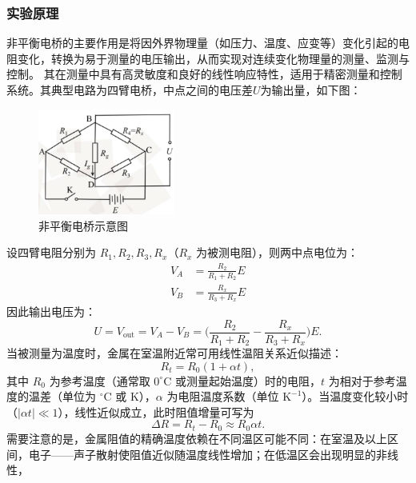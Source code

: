 \documentclass[]{../template/Report}%
\begin{document}
\subsubsection{实验原理}
非平衡电桥的主要作用是将因外界物理量（如压力、温度、应变等）变化引起的电阻变化，转换为易于测量的电压输出，从而实现对连续变化物理量的测量、监测与控制。
其在测量中具有高灵敏度和良好的线性响应特性，适用于精密测量和控制系统。其典型电路为四臂电桥，中点之间的电压差$U$为输出量，如下图：
\begin{figure}[H]
    \centering
    \includegraphics[width=0.4\textwidth]{figure/非平衡电桥示意图.png}
    \caption{非平衡电桥示意图}
    \label{fig:fig1}
\end{figure}
\noindent 设四臂电阻分别为 $R_1,R_2,R_3,R_x$（$R_x$ 为被测电阻），则两中点电位为：
\begin{equation}
\begin{aligned}
V_A&=\frac{R_2}{R_1+R_2}E\\
V_B&=\frac{R_x}{R_3+R_x}E
\end{aligned}
\end{equation}
因此输出电压为：
\begin{equation}
U=V_{\text{out}}=V_A-V_B
=\Big(\frac{R_2}{R_1+R_2}-\frac{R_x}{R_3+R_x}\Big)E.
\end{equation}
当被测量为温度时，金属在室温附近常可用线性温阻关系近似描述：
\begin{equation}
R_t=R_0(1+\alpha t),
\end{equation}
其中 $R_0$ 为参考温度（通常取 $0^{\circ}\mathrm{C}$ 或测量起始温度）时的电阻，$t$ 为相对于参考温度的温差（单位为 $^{\circ}\mathrm{C}$ 或 K），$\alpha$ 为电阻温度系数（单位 $\mathrm{K}^{-1}$）。当温度变化较小时（$|\alpha t|\ll1$），线性近似成立，此时阻值增量可写为
\begin{equation}
\Delta R=R_t-R_0\approx R_0\alpha t.
\end{equation}
需要注意的是，金属阻值的精确温度依赖在不同温区可能不同：在室温及以上区间，电子——声子散射使阻值近似随温度线性增加；在低温区会出现明显的非线性，
\end{document}
